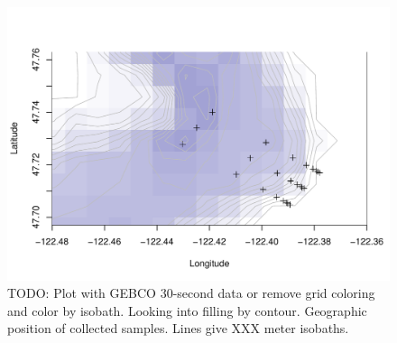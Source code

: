 \documentclass[11pt,letterpaper]{article} %
\begin{document}
{\begin{figure}[h!] %
  \centering
    \includegraphics[width=1\textwidth]{../../Figures/site_map.pdf}
    \caption{TODO: Plot with GEBCO 30-second data or remove grid coloring and color by isobath. Looking into filling by contour. Geographic position of collected samples. Lines give XXX meter isobaths.}
  \label{site_map} %
\end{figure}

}
\end{document}
